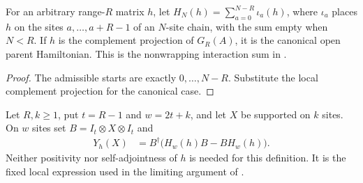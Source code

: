 \begin{definition}
    \label{def:finite_open_interaction_matrix}
    \leanok
    For an arbitrary range-$R$ matrix $h$, let
    $H_N(h)=\sum_{a=0}^{N-R}\iota_a(h)$, where $\iota_a$ places $h$
    on the sites $a,\ldots,a+R-1$ of an $N$-site chain, with the sum
    empty when $N<R$. If $h$ is the complement
    projection of $G_R(A)$, it is the canonical open parent Hamiltonian.
    This is the nonwrapping interaction sum in
    \cite[equation (3.12)]{Nachtergaele1996Spectral}.
\end{definition}
\begin{proof}\leanok
    The admissible starts are exactly $0,\ldots,N-R$. Substitute the local
    complement projection for the canonical case.
\end{proof}

\begin{definition}
    \label{def:fixed_local_commutator_observable}
    \leanok
    Let $R,k\geq1$, put $t=R-1$ and $w=2t+k$, and let $X$ be supported
    on $k$ sites. On $w$ sites set $B=I_t\otimes X\otimes I_t$ and
    \begin{align}
        Y_h(X) & =B^\dagger\bigl(H_w(h)B-BH_w(h)\bigr).
    \end{align}
    Neither positivity nor self-adjointness of $h$ is needed for this
    definition. It is the fixed local expression used in the limiting
    argument of \cite[Section~6]{Nachtergaele1996Spectral}.
\end{definition}

